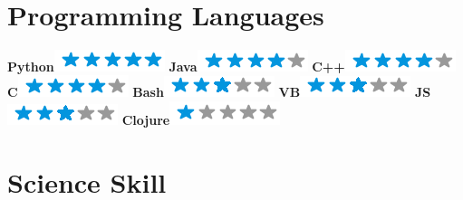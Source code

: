 \begin{aside}
	~
	~
	~
	~
	~
	~
	~
	~
	~
	~
	~
    \section{Programming Languages}
    \textbf{Python}\includegraphics[scale=0.40]{img/5stars.png}
    \textbf{Java}\includegraphics[scale=0.40]{img/4stars.png}
    \textbf{C++}\includegraphics[scale=0.40]{img/4stars.png}
    \textbf{C}\includegraphics[scale=0.40]{img/4stars.png}
    \textbf{Bash}\includegraphics[scale=0.40]{img/3stars.png}
    \textbf{VB}\includegraphics[scale=0.40]{img/3stars.png}
    \textbf{JS}\includegraphics[scale=0.40]{img/3stars.png}
    \textbf{Clojure}\includegraphics[scale=0.40]{img/1stars.png}
    ~
	~
	~
	~
	~
	~
	~
	~
	~
	~
	~
	~
	~
	~
	~
    \section{Science Skill}
    ~
    ~
    ~
\end{aside}
